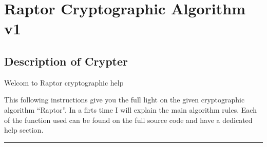 \documentclass[letterpaper,10pt,english]{sphinxmanual}
\begin{document}
\chapter{Raptor Cryptographic Algorithm v1}
\label{\detokenize{basetestrecursivev2:raptor-cryptographic-algorithm-v1}}\label{\detokenize{basetestrecursivev2::doc}}
\newpage
\section{Description of Crypter}
\label{\detokenize{Description of Crypterv1:description-of-crypter}}\label{\detokenize{Description of Crypterv1::doc}}
\sphinxAtStartPar
Welcom to Raptor cryptographic help

\sphinxAtStartPar
This following instructions give you the full light on the given cryptographic algorithm “Raptor”.
In a firts time I will explain the main algorithm rules. Each of the function used can be found on the
full source code and have a dedicated help section.

\sphinxAtStartPar
{}


\bigskip\hrule\bigskip
\end{document}
